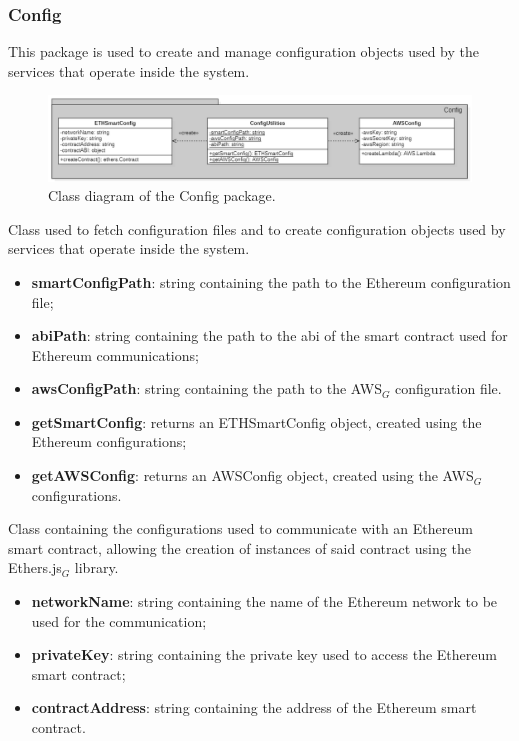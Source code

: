	\subsubsection{Config}
	This package is used to create and manage configuration objects used by the services that operate inside the system.
	\begin{figure} [h!]
		\centering
		\includegraphics[width=1\linewidth]{diagrammi/etherless-server/Config}
		\caption{Class diagram of the Config package.}
	\end{figure}
	Class used to fetch configuration files and to create configuration objects used by services that operate inside the system.
	\begin{itemize}
		\item \textbf{smartConfigPath}: string containing the path to the Ethereum configuration file;
		\item \textbf{abiPath}: string containing the path to the abi of the smart contract used for Ethereum communications;
		\item \textbf{awsConfigPath}: string containing the path to the AWS$_{G}$ configuration file.
	\end{itemize}
	\begin{itemize}
		\item \textbf{getSmartConfig}: returns an ETHSmartConfig object, created using the Ethereum configurations;
		\item \textbf{getAWSConfig}: returns an AWSConfig object, created using the AWS$_{G}$ configurations.
	\end{itemize}
	Class containing the configurations used to communicate with an Ethereum smart contract, allowing the creation of instances of said contract using the Ethers.js$_{G}$ library.
	\begin{itemize}
		\item \textbf{networkName}: string containing the name of the Ethereum network to be used for the communication;
		\item \textbf{privateKey}: string containing the private key used to access the Ethereum smart contract;
		\item \textbf{contractAddress}: string containing the address of the Ethereum smart contract.
	\end{itemize}
